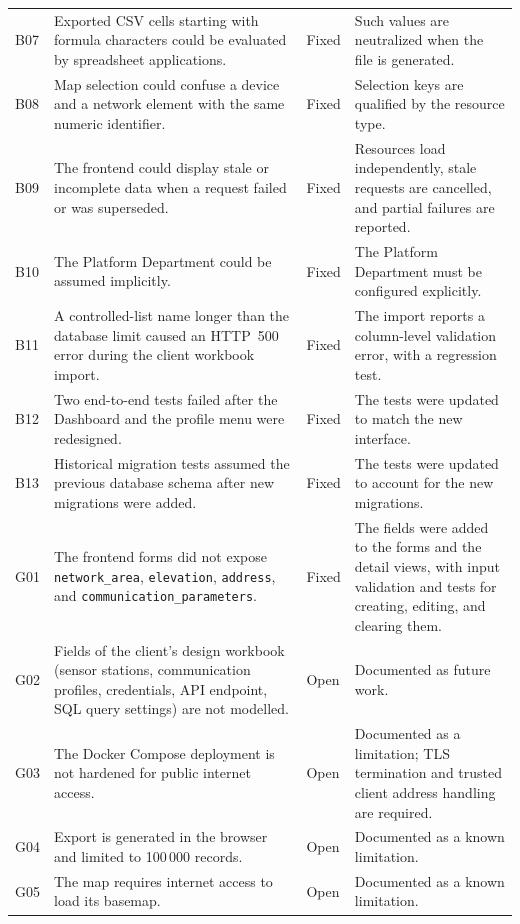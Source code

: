 \documentclass[11pt,a4paper]{article}
\begin{document}
{\begin{longtable}{P{1.2cm} P{5.4cm} P{1.8cm} P{6.6cm}}
B07 &
Exported CSV cells starting with formula characters could be evaluated
by spreadsheet applications. &
Fixed &
Such values are neutralized when the file is generated. \\

B08 &
Map selection could confuse a device and a network element with the
same numeric identifier. &
Fixed &
Selection keys are qualified by the resource type. \\

B09 &
The frontend could display stale or incomplete data when a request
failed or was superseded. &
Fixed &
Resources load independently, stale requests are cancelled, and
partial failures are reported. \\

B10 &
The Platform Department could be assumed implicitly. &
Fixed &
The Platform Department must be configured explicitly. \\

B11 &
A controlled-list name longer than the database limit caused an
HTTP~500 error during the client workbook import. &
Fixed &
The import reports a column-level validation error, with a regression
test. \\

B12 &
Two end-to-end tests failed after the Dashboard and the profile menu
were redesigned. &
Fixed &
The tests were updated to match the new interface. \\

B13 &
Historical migration tests assumed the previous database schema after
new migrations were added. &
Fixed &
The tests were updated to account for the new migrations. \\

G01 &
The frontend forms did not expose \texttt{network\_area},
\texttt{elevation}, \texttt{address}, and
\texttt{communication\_parameters}. &
Fixed &
The fields were added to the forms and the detail views, with input
validation and tests for creating, editing, and clearing them. \\

G02 &
Fields of the client's design workbook (sensor stations, communication
profiles, credentials, API endpoint, SQL query settings) are not
modelled. &
Open &
Documented as future work. \\

G03 &
The Docker Compose deployment is not hardened for public internet
access. &
Open &
Documented as a limitation; TLS termination and trusted client address
handling are required. \\

G04 &
Export is generated in the browser and limited to 100\,000 records. &
Open &
Documented as a known limitation. \\

G05 &
The map requires internet access to load its basemap. &
Open &
Documented as a known limitation. \\

\end{longtable}
}
\end{document}
